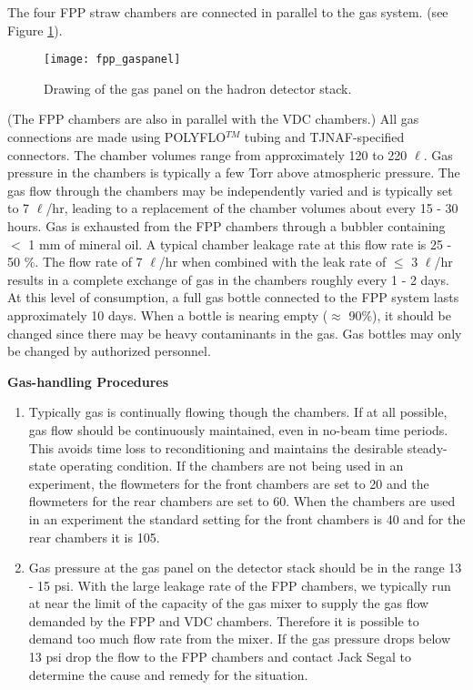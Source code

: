 {The four FPP straw chambers are connected in parallel to the gas system.
(see Figure \ref{fig:gaspanel}).

\begin{figure}
\begin{center}
\texttt{[image: fpp\_gaspanel]}
{\linespread{1.}
\caption[Detectors: Hadron Arm Gas Panel]{Drawing of the gas panel on the hadron detector stack.}
\label{fig:gaspanel}}
\end{center}
\end{figure}


(The FPP chambers are also in parallel with the VDC chambers.)
All gas connections
are made using POLYFLO$^{TM}$ tubing and TJNAF-specified connectors.
The chamber volumes range from approximately
120 to 220 $\ell$.
Gas pressure in the chambers is typically a few Torr above atmospheric
pressure.
The gas flow through the chambers may be independently varied and is
typically set to 7 $\ell$/hr, leading to a replacement of the chamber
volumes about every 15 - 30 hours.
Gas is exhausted from the FPP chambers through a bubbler containing $<$ 1 mm
of mineral oil. A typical chamber leakage rate at this flow rate is 25 - 50
$\%$.
The flow rate of 7 $\ell$/hr when combined with the leak rate of
$\le$ 3 $\ell$/hr results in a complete exchange of gas in the chambers
roughly every 1 - 2 days.
At this level of consumption, a full gas bottle connected to the FPP system
lasts approximately 10 days.
When a bottle is nearing empty ($\approx$ 90$\%$), it should be changed since
there may be heavy contaminants in the gas.
Gas bottles may only be changed by authorized personnel.

\begin{center}
{\bf Gas-handling Procedures}
\end{center}

\begin{enumerate}
\item Typically gas is continually flowing though the chambers.
If at all possible, gas flow should be continuously
maintained, even in no-beam time periods.   This avoids time loss to
reconditioning and maintains the desirable steady-state operating
condition. If the chambers are not being used in an experiment, 
the flowmeters for the front chambers
are set to 20 and the flowmeters for the rear chambers are set to 60.
When the chambers are used in an experiment the standard setting
for the front chambers is 40 and for the rear chambers it is 105. 
\item Gas pressure at the gas panel on the 
detector stack should be in the range
13 - 15 psi. With the large leakage rate of the
FPP chambers, we typically run at near the limit of the capacity of the
gas mixer to supply the gas flow demanded by the FPP and VDC chambers.
Therefore it is possible to demand too much flow rate from the mixer.
If the gas pressure drops below 13 psi drop the flow to the FPP chambers
and contact Jack Segal to determine the cause and
remedy for the situation.
\end{enumerate}

}
